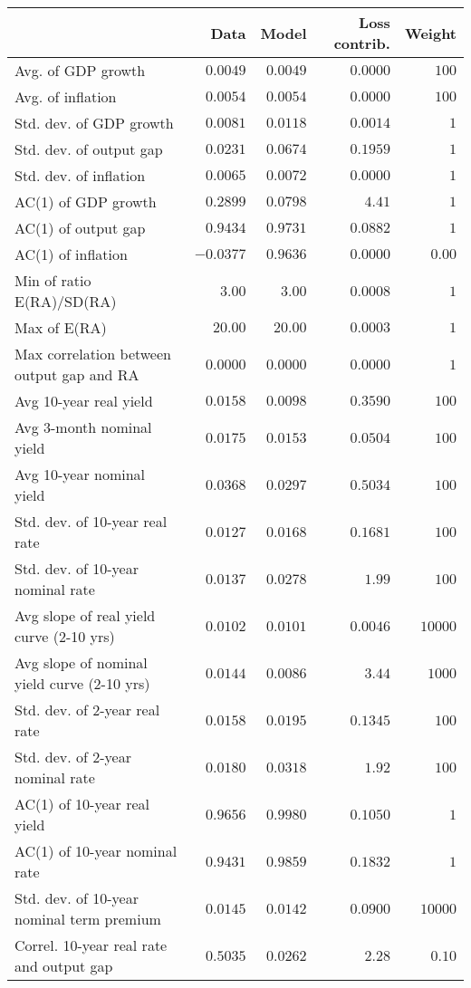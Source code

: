 \begin{tabular}{lrrrr} \hline  & Data & Model & Loss contrib. & Weight \\ \hline Avg. of GDP growth & $0.0049$ & $0.0049$ & $0.0000$ & $100$ \\ Avg. of inflation & $0.0054$ & $0.0054$ & $0.0000$ & $100$ \\ Std. dev. of GDP growth & $0.0081$ & $0.0118$ & $0.0014$ & $1$ \\ Std. dev. of output gap & $0.0231$ & $0.0674$ & $0.1959$ & $1$ \\ Std. dev. of inflation & $0.0065$ & $0.0072$ & $0.0000$ & $1$ \\ AC(1) of GDP growth & $0.2899$ & $0.0798$ & $4.41$ & $1$ \\ AC(1) of output gap & $0.9434$ & $0.9731$ & $0.0882$ & $1$ \\ AC(1) of inflation & $-0.0377$ & $0.9636$ & $0.0000$ & $0.00$ \\ Min of ratio E(RA)/SD(RA) & $3.00$ & $3.00$ & $0.0008$ & $1$ \\ Max of E(RA) & $20.00$ & $20.00$ & $0.0003$ & $1$ \\ Max correlation between output gap and RA & $0.0000$ & $0.0000$ & $0.0000$ & $1$ \\ Avg 10-year real yield & $0.0158$ & $0.0098$ & $0.3590$ & $100$ \\ Avg 3-month nominal yield & $0.0175$ & $0.0153$ & $0.0504$ & $100$ \\ Avg 10-year nominal yield & $0.0368$ & $0.0297$ & $0.5034$ & $100$ \\ Std. dev. of 10-year real rate & $0.0127$ & $0.0168$ & $0.1681$ & $100$ \\ Std. dev. of 10-year nominal rate & $0.0137$ & $0.0278$ & $1.99$ & $100$ \\ Avg slope of real yield curve (2-10 yrs) & $0.0102$ & $0.0101$ & $0.0046$ & $10000$ \\ Avg slope of nominal yield curve (2-10 yrs) & $0.0144$ & $0.0086$ & $3.44$ & $1000$ \\ Std. dev. of 2-year real rate & $0.0158$ & $0.0195$ & $0.1345$ & $100$ \\ Std. dev. of 2-year nominal rate & $0.0180$ & $0.0318$ & $1.92$ & $100$ \\ AC(1) of 10-year real yield & $0.9656$ & $0.9980$ & $0.1050$ & $1$ \\ AC(1) of 10-year nominal rate & $0.9431$ & $0.9859$ & $0.1832$ & $1$ \\ Std. dev. of 10-year nominal term premium & $0.0145$ & $0.0142$ & $0.0900$ & $10000$ \\ Correl. 10-year real rate and output gap & $0.5035$ & $0.0262$ & $2.28$ & $0.10$ \\ \hline \end{tabular}